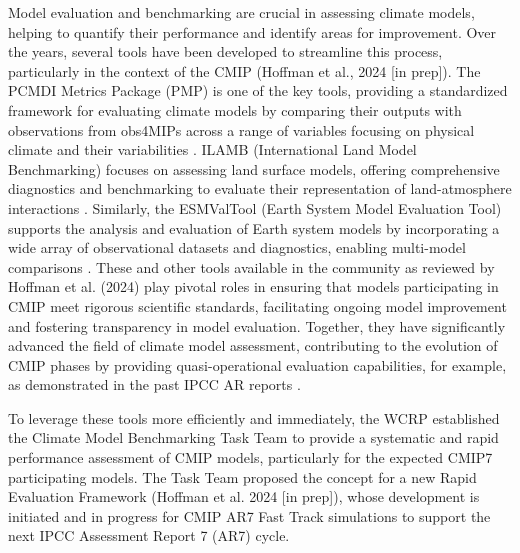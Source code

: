 \documentclass[gmd, preprint]{copernicus}
\begin{document}
Model evaluation and benchmarking are crucial in assessing climate models, helping to quantify their performance and identify areas for improvement. Over the years, several tools have been developed to streamline this process, particularly in the context of the CMIP (Hoffman et al., 2024 [in prep]). The PCMDI Metrics Package (PMP) is one of the key tools, providing a standardized framework for evaluating climate models by comparing their outputs with observations from obs4MIPs across a range of variables focusing on physical climate and their variabilities \citep{gleckler_more_2016,lee_systematic_2024}. ILAMB (International Land Model Benchmarking) focuses on assessing land surface models, offering comprehensive diagnostics and benchmarking to evaluate their representation of land-atmosphere interactions \citep{collier_international_2018}. Similarly, the ESMValTool (Earth System Model Evaluation Tool) supports the analysis and evaluation of Earth system models by incorporating a wide array of observational datasets and diagnostics, enabling multi-model comparisons \citep{eyring_overview_2016}. These and other tools available in the community as reviewed by Hoffman et al. (2024) play pivotal roles in ensuring that models participating in CMIP meet rigorous scientific standards, facilitating ongoing model improvement and fostering transparency in model evaluation. Together, they have significantly advanced the field of climate model assessment, contributing to the evolution of CMIP phases by providing quasi-operational evaluation capabilities, for example, as demonstrated in the past IPCC AR reports \citep{mcavaney_model_2001,flato_evaluation_2013,eyring_human_2021}.

To leverage these tools more efficiently and immediately, the WCRP established the Climate Model Benchmarking Task Team to provide a systematic and rapid performance assessment of CMIP models, particularly for the expected CMIP7 participating models. The Task Team proposed the concept for a new Rapid Evaluation Framework (Hoffman et al. 2024 [in prep]), whose development is initiated and in progress for CMIP AR7 Fast Track simulations to support the next IPCC Assessment Report 7 (AR7) cycle.
\end{document}
